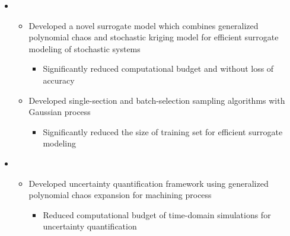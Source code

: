 \documentclass[10pt]{article}
\begin{document}
\begin{itemize}
\begin{itemize}[label=$\bullet$]
	    \item {}
	    \begin{itemize}[label=$\bullet$]
	        \item Developed a novel surrogate model which combines generalized polynomial chaos and stochastic kriging model for efficient surrogate modeling of stochastic systems
	        \begin{itemize}[label=$-$]
	            \item Significantly reduced computational budget and without loss of accuracy 
	        \end{itemize}
	        
	        \item Developed single-section and batch-selection sampling algorithms with Gaussian process
	        \begin{itemize}[label=$-$]
	            \item Significantly reduced the size of training set for efficient surrogate modeling
	        \end{itemize}
	    \end{itemize}
	    
		\item {}
		\begin{itemize}[label=$\bullet$]
		    \item Developed uncertainty quantification framework using generalized polynomial chaos expansion for machining process 
		    \begin{itemize}[label=$-$]
		    \item Reduced computational budget of time-domain simulations for uncertainty quantification
		    \end{itemize}
		\end{itemize}
	\end{itemize}
\end{itemize}


\end{document}
